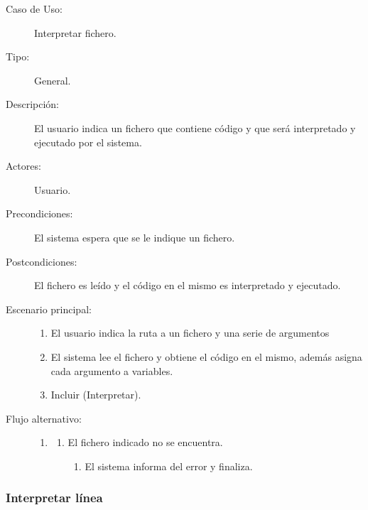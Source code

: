 \begin{description}
   \item[Caso de Uso:]  Interpretar fichero.
   \item[Tipo:] General.
   \item[Descripción:] 
   El usuario indica un fichero que contiene código y que será 
   interpretado y ejecutado por el sistema.
   \item[Actores:] 
   Usuario.
   \item[Precondiciones:] 
   El sistema espera que se le indique un fichero.
   \item[Postcondiciones:] 
   El fichero es leído y el código en el mismo es interpretado y ejecutado.
   \item[Escenario principal:] \hfill
   \begin{enumerate}
   \item El usuario indica la ruta a un fichero y una serie de argumentos
   \item El sistema lee el fichero y obtiene el código en el mismo, además asigna cada argumento a variables.
   \item Incluir (Interpretar).
   \end{enumerate}
   
   \item[Flujo alternativo:] \hfill 
   \begin{enumerate} \itemsep1pt \parskip0pt 
   \setcounter{enumi}{1}
   \renewcommand{\labelenumi}{}
   \renewcommand{\labelenumiii}{\arabic{enumiii}.}
   \renewcommand{\labelenumii}{\arabic{enumi}\alph{enumii}.}
      \item 
      \begin {enumerate}
         \setcounter{enumii}{0}
         \item El fichero indicado no se encuentra.
         \begin{enumerate}
         \item El sistema informa del error y finaliza.
         \end{enumerate}
      \end{enumerate}
   \end{enumerate}
\end{description}

\subsubsection{Interpretar línea}

